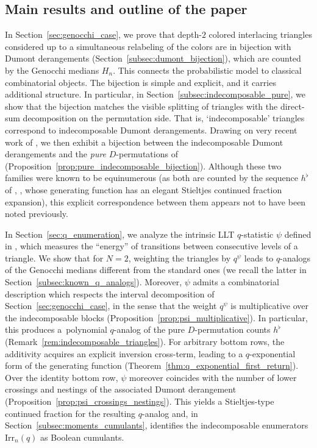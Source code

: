 \documentclass[pdftex]{sigma}
\numberwithin{equation}{section}
\theoremstyle{definition}
\begin{document}
\subsection{Main results and outline of the paper}
\label{subsec:main_results}

In Section~\ref{sec:genocchi_case}, we prove that depth-$2$ colored interlacing triangles considered up to a simultaneous relabeling of the colors are in bijection with Dumont derangements (Section~\ref{subsec:dumont_bijection}), which are counted by the Genocchi medians $H_n$.  This connects the probabilistic model to classical combinatorial objects.  The bijection is simple and explicit, and it carries additional structure. In particular, in Section~\ref{subsec:indecomposable_pure}, we show that the bijection matches the visible splitting of triangles with the direct-sum decomposition on the permutation side. That is, `indecomposable' triangles correspond to indecomposable Dumont derangements.  Drawing on very recent work of \cite{PoddarSawantShankar2026}, we then exhibit a bijection between the indecomposable Dumont derangements and the \emph{pure} $D$-permutations of \cite{DebSokal2024} (Proposition~\ref{prop:pure_indecomposable_bijection}).  Although these two families were known to be equinumerous (as both are counted by the sequence $h^\flat$ of \cite{DebSokal2024}, \cite[A362111]{OEIS}, whose generating function has an elegant Stieltjes continued fraction expansion), this explicit correspondence between them appears not to have been noted previously.

In Section~\ref{sec:q_enumeration}, we analyze the intrinsic LLT $q$-statistic $\psi$ defined in \cite{ABW2023coloured_LLT}, which measures the ``energy'' of transitions between consecutive levels of a triangle.  We show that for $N=2$, weighting the triangles by $q^{\psi}$ leads to $q$-analogs of the Genocchi medians different from the standard ones (we recall the latter in Section~\ref{subsec:known_q_analogs}).  Moreover, $\psi$ admits a combinatorial description which respects the interval decomposition of Section~\ref{sec:genocchi_case}, in the sense that the weight $q^{\psi}$ is multiplicative over the indecomposable blocks (Proposition~\ref{prop:psi_multiplicative}).  In particular, this produces a~polynomial $q$-analog of the pure $D$-permutation counts $h^\flat$ (Remark~\ref{rem:indecomposable_triangles}).  For arbitrary bottom rows, the additivity acquires an explicit inversion cross-term, leading to a $q$-exponential form of the generating function (Theorem~\ref{thm:q_exponential_first_return}).  Over the identity bottom row, $\psi$ moreover coincides with the number of lower crossings and nestings of the associated Dumont derangement (Proposition~\ref{prop:psi_crossings_nestings}).  This yields a Stieltjes-type continued fraction for the resulting $q$-analog and, in Section~\ref{subsec:moments_cumulants}, identifies the indecomposable enumerators $\mathrm{Irr}_n(q)$ as Boolean cumulants.
\end{document}
